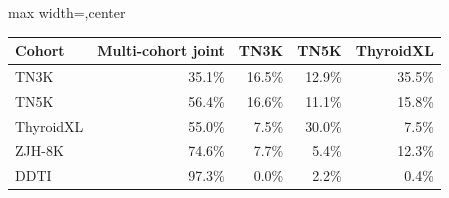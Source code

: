 \begin{responsetable}
\caption{}
\begin{adjustbox}{max width=\textwidth,center}
\begin{tabular}{@{}l r r r r@{}}
\toprule
Cohort & Multi-cohort joint & TN3K & TN5K & ThyroidXL \\
\midrule
TN3K & 35.1\% & 16.5\% & 12.9\% & 35.5\% \\
TN5K & 56.4\% & 16.6\% & 11.1\% & 15.8\% \\
ThyroidXL & 55.0\% & 7.5\% & 30.0\% & 7.5\% \\
ZJH-8K & 74.6\% & 7.7\% & 5.4\% & 12.3\% \\
DDTI & 97.3\% & 0.0\% & 2.2\% & 0.4\% \\
\bottomrule
\end{tabular}
\end{adjustbox}
\end{responsetable}
